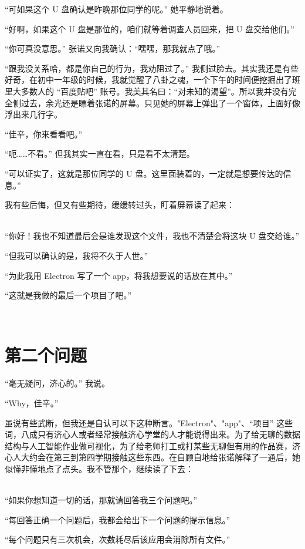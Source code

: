 \documentclass[UTF8]{ctexart}
\begin{document}
“可如果这个 U 盘确认是昨晚那位同学的呢。” 她平静地说着。

“好啊，如果这个 U 盘是那位的，咱们就等着调查人员回来，把 U 盘交给他们。”

“你可真没意思。” 张诺又向我确认：“嘿嘿，那我就点了哦。”

“跟我没关系哈，都是你自己的行为，我劝阻过了。” 我侧过脸去。其实我还是有些好奇，在初中一年级的时候，我就觉醒了八卦之魂，一个下午的时间便挖掘出了班里大多数人的 “百度贴吧” 账号。我美其名曰：“对未知的渴望”。所以我并没有完全侧过去，余光还是瞟着张诺的屏幕。只见她的屏幕上弹出了一个窗体，上面好像浮出来几行字。

“佳辛，你来看看吧。”

“呃……不看。” 但我其实一直在看，只是看不太清楚。

“可以证实了，这就是那位同学的 U 盘。这里面装着的，一定就是想要传达的信息。”

我有些后悔，但又有些期待，缓缓转过头，盯着屏幕读了起来：

~\\

“你好！我也不知道最后会是谁发现这个文件，我也不清楚会将这块 U 盘交给谁。”

“但我可以确认的是，我将不久于人世。”

“为此我用 Electron 写了一个 app，将我想要说的话放在其中。”

“这就是我做的最后一个项目了吧。”

~\\

\section{第二个问题}

“毫无疑问，济心的。” 我说。

“Why，佳辛。”

虽说有些武断，但我还是自认可以下这种断言。"Electron"、"app"、“项目” 这些词，八成只有济心人或者经常接触济心学堂的人才能说得出来。为了给无聊的数据结构与人工智能作业做可视化，为了给老师打工或打某些无聊但有用的作品赛，济心人大约会在第三到第四学期接触这些东西。在自顾自地给张诺解释了一通后，她似懂非懂地点了点头。我不管那个，继续读了下去：

~\\

“如果你想知道一切的话，那就请回答我三个问题吧。”

“每回答正确一个问题后，我都会给出下一个问题的提示信息。”

“每个问题只有三次机会，次数耗尽后该应用会消除所有文件。”
\end{document}
